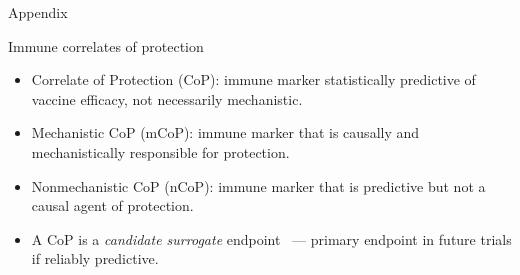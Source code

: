 \documentclass{beamer}
\begin{document}

\appendix
\begin{frame}[standout]
  Appendix
\end{frame}


\begin{frame}[c]{Immune correlates of
  protection~\citep{plotkin2012nomenclature}}

\begin{center}
\begin{itemize}
  \itemsep8pt
  \item Correlate of Protection (CoP): immune marker statistically predictive
    of vaccine efficacy, not necessarily mechanistic.
  \item Mechanistic CoP (mCoP): immune marker that is causally and
    mechanistically responsible for protection.
  \item Nonmechanistic CoP (nCoP): immune marker that is predictive but not a
    causal agent of protection.
  \item A CoP is a \textit{candidate surrogate}
      endpoint~\citep{prentice1989surrogate} --- primary
      endpoint in future trials if reliably predictive.
\end{itemize}
\end{center}

\note{
}

\end{frame}

\end{document}
